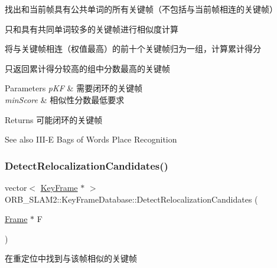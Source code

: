 \begin{DoxyEnumerate}
\item 找出和当前帧具有公共单词的所有关键帧（不包括与当前帧相连的关键帧）
\item 只和具有共同单词较多的关键帧进行相似度计算
\item 将与关键帧相连（权值最高）的前十个关键帧归为一组，计算累计得分
\item 只返回累计得分较高的组中分数最高的关键帧 
\begin{DoxyParams}{Parameters}
{\em p\+KF} & 需要闭环的关键帧 \\
\hline
{\em min\+Score} & 相似性分数最低要求 \\
\hline
\end{DoxyParams}
\begin{DoxyReturn}{Returns}
可能闭环的关键帧 
\end{DoxyReturn}
\begin{DoxySeeAlso}{See also}
I\+I\+I-\/E Bags of Words Place Recognition 
\end{DoxySeeAlso}

\end{DoxyEnumerate}\mbox{\label{class_o_r_b___s_l_a_m2_1_1_key_frame_database_a008586e4d07ece0d948d0f1633447a2b}} 
\subsubsection{\texorpdfstring{Detect\+Relocalization\+Candidates()}{DetectRelocalizationCandidates()}}
{\footnotesize\ttfamily vector$<$ \mbox{\hyperlink{class_o_r_b___s_l_a_m2_1_1_key_frame}{Key\+Frame}} $\ast$ $>$ O\+R\+B\+\_\+\+S\+L\+A\+M2\+::\+Key\+Frame\+Database\+::\+Detect\+Relocalization\+Candidates (\begin{DoxyParamCaption}\item[{\mbox{\hyperlink{class_o_r_b___s_l_a_m2_1_1_frame}{Frame}} $\ast$}]{F }\end{DoxyParamCaption})}



在重定位中找到与该帧相似的关键帧 


